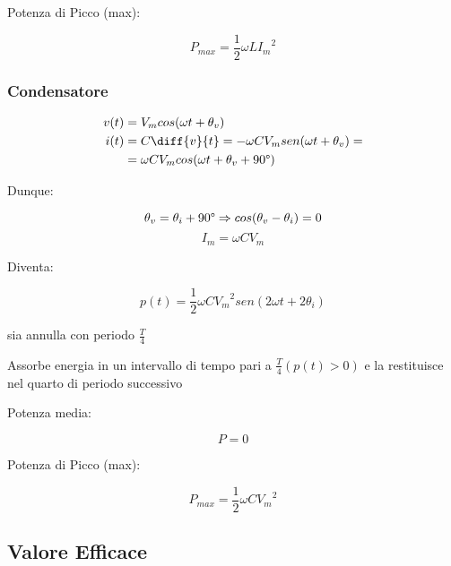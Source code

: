 \documentclass[12pt,titlepage,a4paper]{book}
\begin{document}
Potenza di Picco (max):

\begin{equation*}
  P_{max} = \frac{1}{2} \omega L {I_m}^2
\end{equation*}


\subsubsection{Condensatore}


\begin{equation*}
  \begin{split}
    v(t) &= V_m cos(\omega t + \theta_v) \\
    i(t) &= C \diff{v}{t} = - \omega C V_m sen(\omega t + \theta_v) = \\
    &= \omega C V_m cos(\omega t + \theta_v + 90\degree)
  \end{split}
\end{equation*}


Dunque:

$$\theta_v = \theta_i + 90\degree \Rightarrow cos(\theta_v - \theta_i) = 0$$
$$ I_m = \omega C V_m $$


Diventa:

\begin{equation*}
  p(t) = \frac{1}{2} \omega C {V_m}^2 sen(2 \omega t + 2 \theta_i)
\end{equation*}

\begin{list}{-}{La potenza istantanea}
  \item sia annulla con periodo $ \frac{T}{4}$
  \item Assorbe energia in un intervallo di tempo pari a $\frac{T}{4} (p(t) > 0)$ e
        la restituisce nel quarto di periodo successivo
\end{list}

Potenza media:

\begin{equation*}
  P = 0
\end{equation*}

Potenza di Picco (max):

\begin{equation*}
  P_{max} = \frac{1}{2} \omega C {V_m}^2
\end{equation*}

\subsection{Valore Efficace}
\end{document}
